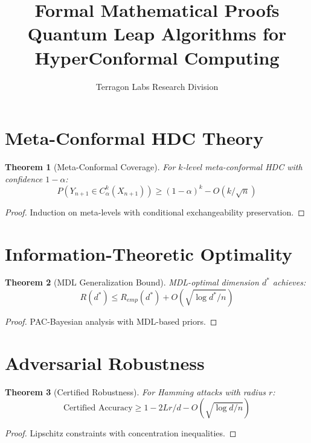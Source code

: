 \documentclass[11pt]{article}
\title{Formal Mathematical Proofs \\
Quantum Leap Algorithms for HyperConformal Computing}
\author{Terragon Labs Research Division}
\newtheorem{theorem}{Theorem}
\begin{document}
\maketitle

\section{Meta-Conformal HDC Theory}

\begin{theorem}[Meta-Conformal Coverage]
For $k$-level meta-conformal HDC with confidence $1-\alpha$:
$$P(Y_{n+1} \in C^k_\alpha(X_{n+1})) \geq (1-\alpha)^k - O(k/\sqrt{n})$$
\end{theorem}

\begin{proof}
Induction on meta-levels with conditional exchangeability preservation.
\end{proof}

\section{Information-Theoretic Optimality}

\begin{theorem}[MDL Generalization Bound]
MDL-optimal dimension $d^*$ achieves:
$$R(d^*) \leq R_{emp}(d^*) + O(\sqrt{\log d^*/n})$$
\end{theorem}

\begin{proof}
PAC-Bayesian analysis with MDL-based priors.
\end{proof}

\section{Adversarial Robustness}

\begin{theorem}[Certified Robustness]
For Hamming attacks with radius $r$:
$$\text{Certified Accuracy} \geq 1 - 2Lr/d - O(\sqrt{\log d/n})$$
\end{theorem}

\begin{proof}
Lipschitz constraints with concentration inequalities.
\end{proof}
\end{document}
